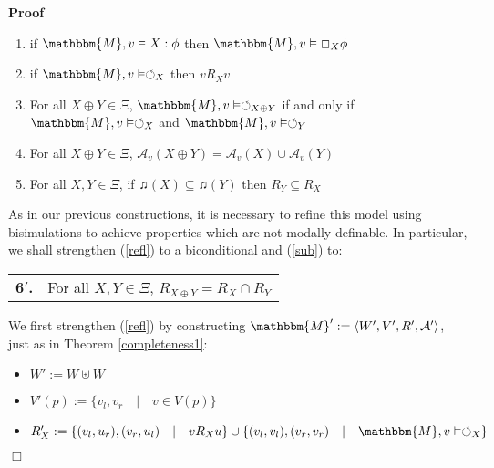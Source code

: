 \documentclass{article}
\newcommand{\assign}{:=}
\newcommand{\tmtextbf}[1]{{\bfseries{#1}}}
\newenvironment{enumeratenumeric}{\begin{enumerate}[1.] }{\end{enumerate}}
\newenvironment{itemizedot}{\begin{itemize} \renewcommand{\labelitemi}{$\bullet$}\renewcommand{\labelitemii}{$\bullet$}\renewcommand{\labelitemiii}{$\bullet$}\renewcommand{\labelitemiv}{$\bullet$}}{\end{itemize}}
\newenvironment{proof}{\noindent\textbf{Proof\ }}{\hspace*{\fill}$\Box$\medskip}
\begin{document}
\begin{proof}
\begin{enumeratenumeric}
    \item if $\mathbbm{M}, v \vDash X : \phi$ then $\mathbbm{M}, v \vDash
    \Box_X \phi$
    
    \item \label{refl}if $\mathbbm{M}, v \vDash \circlearrowleft_X$ then $v
    R_X v$
    
    \item \label{sndness}For all $X \oplus Y \in \Xi$, $\mathbbm{M}, v \vDash
    \circlearrowleft_{X \oplus Y}$ if and only if $\mathbbm{M}, v \vDash
    \circlearrowleft_X$ and $\mathbbm{M}, v \vDash \circlearrowleft_Y$
    
    \item \label{union}For all $X \oplus Y \in \Xi$, $\mathcal{A}_v (X \oplus
    Y) = \mathcal{A}_v (X) \cup \mathcal{A}_v (Y)$
    
    \item \label{sub}For all $X, Y \in \Xi$, if $\twonotes (X) \subseteq
    \twonotes (Y)$ then $R_Y \subseteq R_X$
  \end{enumeratenumeric}
  As in our previous constructions, it is necessary to refine this model using
  bisimulations to achieve properties which are not modally definable.  In
  particular, we shall strengthen (\ref{refl}) to a biconditional and
  (\ref{sub}) to:
  
  \begin{center}
    \begin{tabular}{ll}
      \tmtextbf{6$'$.} & For all $X, Y \in \Xi$, $R_{X \oplus Y} = R_X \cap
      R_Y$
    \end{tabular}
  \end{center}
  
  
  
  We first strengthen (\ref{refl}) by constructing $\mathbbm{M}' \assign
  \langle W', V', R', \mathcal{A}' \rangle$, just as in Theorem
  \ref{completeness1}: {\hspace*{\fill}}
  \begin{itemizedot}
    \item $W' \assign W \uplus W$
    
    \item $V' (p) \assign \{v_l, v_r \hspace{1em} | \hspace{1em} v \in V
    (p)\}$
    
    \item $R'_X \assign \{(v_l, u_r), (v_r, u_l) \hspace{1em} | \hspace{1em} v
    R_X u\} \cup \{(v_l, v_l), (v_r, v_r) \hspace{1em} | \hspace{1em}
    \mathbbm{M}, v \vDash \circlearrowleft_X \}$
    

\end{itemizedot}
\end{proof}
\end{document}
